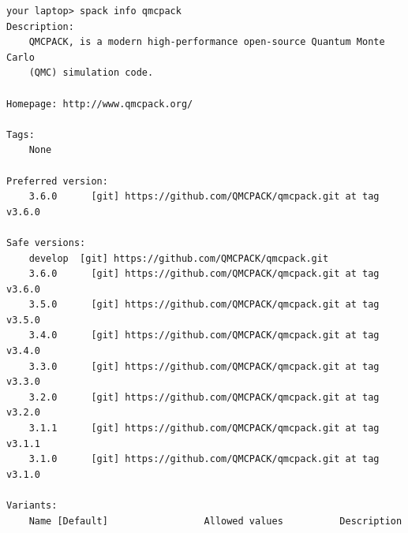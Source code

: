 \begin{lstlisting}[style=SHELL]
your laptop> spack info qmcpack
Description:
    QMCPACK, is a modern high-performance open-source Quantum Monte Carlo
    (QMC) simulation code.

Homepage: http://www.qmcpack.org/

Tags:
    None

Preferred version:
    3.6.0      [git] https://github.com/QMCPACK/qmcpack.git at tag v3.6.0

Safe versions:
    develop  [git] https://github.com/QMCPACK/qmcpack.git
    3.6.0      [git] https://github.com/QMCPACK/qmcpack.git at tag v3.6.0
    3.5.0      [git] https://github.com/QMCPACK/qmcpack.git at tag v3.5.0
    3.4.0      [git] https://github.com/QMCPACK/qmcpack.git at tag v3.4.0
    3.3.0      [git] https://github.com/QMCPACK/qmcpack.git at tag v3.3.0
    3.2.0      [git] https://github.com/QMCPACK/qmcpack.git at tag v3.2.0
    3.1.1      [git] https://github.com/QMCPACK/qmcpack.git at tag v3.1.1
    3.1.0      [git] https://github.com/QMCPACK/qmcpack.git at tag v3.1.0

Variants:
    Name [Default]                 Allowed values          Description



\end{lstlisting}
